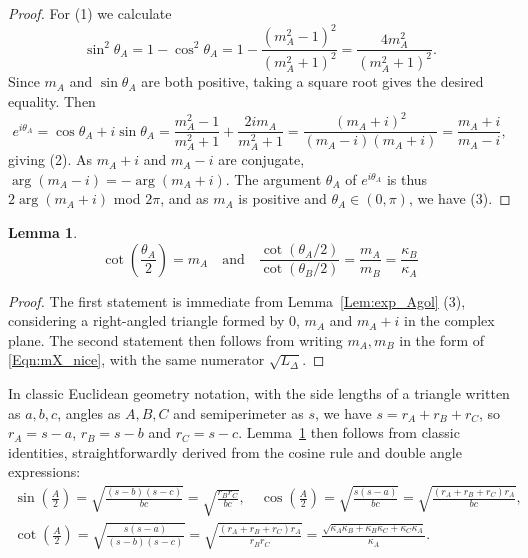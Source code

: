 \documentclass[12pt]{amsart}
\numberwithin{equation}{section}
\newtheorem{lem}[equation]{Lemma}
\theoremstyle{named}
\newcommand{\refeqn}[1]{\eqref{Eqn:#1}}
\newcommand{\reflem}[1]{Lemma~\ref{Lem:#1}}
\begin{document}
\begin{proof}
For (1) we calculate
\[
\sin^2 \theta_A = 1 - \cos^2 \theta_A
= 1 - \frac{ \left( m_A^2-1 \right)^2}{ \left( m_A^2+1 \right)^2}
= \frac{4m_A^2}{\left( m_A^2 + 1 \right)^2}.
\]
Since $m_A$ and $\sin \theta_A$ are both positive, taking a square root gives the desired equality. Then
\[
e^{i \theta_A} = \cos \theta_A + i \sin \theta_A 
= \frac{m_A^2-1}{m_A^2 + 1} + \frac{2 i m_A }{m_A^2 + 1} 
= \frac{ \left( m_A + i \right)^2}{\left( m_A - i \right) \left( m_A + i \right)}
= \frac{m_A + i }{m_A - i},
\]
giving (2). As $m_A + i$ and $m_A - i$ are conjugate, $\arg(m_A - i) = -\arg(m_A + i)$. The argument $\theta_A$ of $e^{i\theta_A}$ is thus $2 \arg (m_A + i)$ mod $2\pi$, and as $m_A$ is positive and $\theta_A \in (0, \pi)$, we have (3). 
\end{proof}

\begin{lem}
\label{Lem:edge_eqn_fact}
\[
\cot \left( \frac{\theta_A}{2} \right) = m_A
\quad \text{and} \quad
\frac{ \cot \left( \theta_A/2 \right)}{ \cot \left( \theta_B / 2 \right) }
= \frac{m_A}{m_B} 
= \frac{\kappa_B}{\kappa_A}
\]
\end{lem}

\begin{proof}
The first statement is immediate from \reflem{exp_Agol} (3), considering a right-angled triangle formed by $0$, $m_A$ and $m_A + i$ in the complex plane. The second statement then follows from writing $m_A, m_B$ in the form of \refeqn{mX_nice}, with the same numerator $\sqrt{L_\Delta}$.
\end{proof}

In classic Euclidean geometry notation, with the side lengths of a triangle written as $a,b,c$, angles as $A,B,C$ and semiperimeter as $s$, we have $s = r_A + r_B + r_C$, so $r_A = s-a$, $r_B = s-b$ and $r_C = s-c$. \reflem{edge_eqn_fact} then follows from classic identities, straightforwardly derived from the cosine rule and double angle expressions:
\begin{gather*}
\sin \left( \frac{A}{2} \right) = \sqrt{ \frac{(s-b)(s-c)}{bc}} = \sqrt{ \frac{r_B r_C}{bc}}, \quad
\cos \left( \frac{A}{2} \right) = \sqrt{ \frac{s(s-a)}{bc} } = \sqrt{ \frac{(r_A + r_B + r_C) r_A}{bc} }, \\
\cot \left( \frac{A}{2} \right) = \sqrt{\frac{s(s-a)}{(s-b)(s-c)}}
= \sqrt{ \frac{(r_A + r_B + r_C) r_A}{r_B r_C}}
= \frac{ \sqrt{\kappa_A \kappa_B + \kappa_B \kappa_C + \kappa_C \kappa_A}}{\kappa_A}.
\end{gather*}
\end{document}
